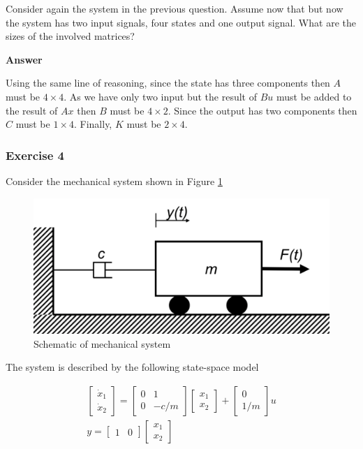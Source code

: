 Consider again the system in the previous  question. Assume now that but now the system has two input signals, four states and one output signal. What are the sizes of the involved matrices?

\textbf{Answer}

Using the same line of reasoning, since the state has three components then $A$ must be $4\times 4$. As we have only two input but the result of $Bu$ must be added to the result of $Ax$ then $B$ must be $4\times 2$. Since the output has two components then $C$ must be $1\times 4$. Finally, $K$ must be $2\times 4$.

\subsubsection{Exercise 4}

Consider the mechanical system shown in Figure \ref{Mechanical_system_3_1_1_ex_4} 

\begin{figure}[!htb]
\begin{center}
\includegraphics[scale=0.280]{img/state_feedback/Mechanical_system_3_1_1_ex_4.png}
\end{center}
\caption{Schematic of mechanical system}
\label{Mechanical_system_3_1_1_ex_4}
\end{figure}

The system is described by the following state-space model

\begin{eqnarray}
\begin{bmatrix}
 \dot{x}_1 \\
 \dot{x}_2 
\end{bmatrix} =  
\begin{bmatrix}
 0 & 1 \\
 0 & -c/m
\end{bmatrix}
\begin{bmatrix}
 x_1 \\
 x_2  
\end{bmatrix}+
\begin{bmatrix}
 0 \\
 1/m  
\end{bmatrix}u \\
y =
\begin{bmatrix}
 1 & 0 
\end{bmatrix}
\begin{bmatrix}
 x_1 \\
 x_2  
\end{bmatrix}
\end{eqnarray}

